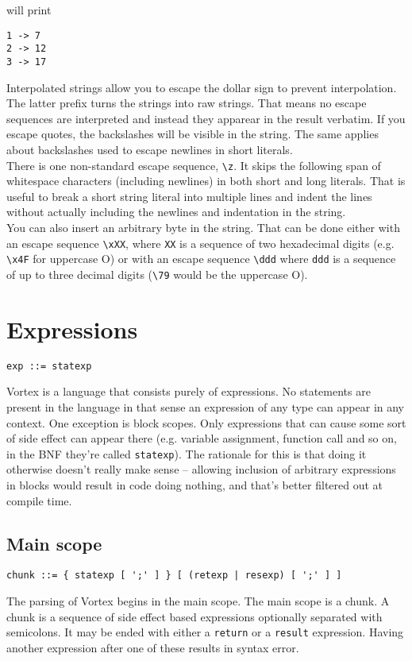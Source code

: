 \documentclass{article}
\begin{document}
will print
\begin{lstlisting}[language=text]
1 -> 7
2 -> 12
3 -> 17
\end{lstlisting}
Interpolated strings allow you to escape the dollar sign to prevent
interpolation.
\\
The latter prefix turns the strings into raw strings. That means no escape
sequences are interpreted and instead they apparear in the result verbatim.
If you escape quotes, the backslashes will be visible in the string. The same
applies about backslashes used to escape newlines in short literals.\\
There is one non-standard escape sequence, \verb|\z|. It skips the following
span of whitespace characters (including newlines) in both short and long
literals. That is useful to break a short string literal into multiple lines
and indent the lines without actually including the newlines and indentation
in the string.\\
You can also insert an arbitrary byte in the string. That can be done either
with an escape sequence \verb|\xXX|, where \verb|XX| is a sequence of two
hexadecimal digits (e.g. \verb|\x4F| for uppercase O) or with an escape
sequence \verb|\ddd| where \verb|ddd| is a sequence of up to three decimal
digits (\verb|\79| would be the uppercase O).

\section{Expressions}
\begin{lstlisting}[language=bnf]
exp ::= statexp
\end{lstlisting}
Vortex is a language that consists purely of expressions. No statements are
present in the language in that sense an expression of any type can appear
in any context. One exception is block scopes. Only expressions that can
cause some sort of side effect can appear there (e.g. variable assignment,
function call and so on, in the BNF they're called \verb|statexp|).
The rationale for this is that doing it otherwise doesn't really make sense
-- allowing inclusion of arbitrary expressions in blocks would result in code
doing nothing, and that's better filtered out at compile time.
\subsection{Main scope}
\begin{lstlisting}[language=bnf]
chunk ::= { statexp [ ';' ] } [ (retexp | resexp) [ ';' ] ]
\end{lstlisting}
The parsing of Vortex begins in the main scope. The main scope is a chunk.
A chunk is a sequence of side effect based expressions optionally separated
with semicolons. It may be ended with either a \verb|return| or a \verb|result|
expression. Having another expression after one of these results in syntax
error.
\end{document}
